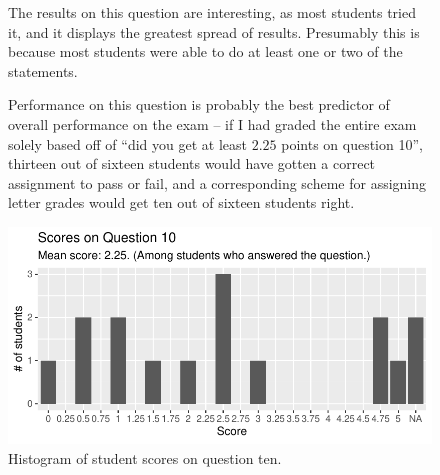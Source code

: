 \documentclass[nobib]{tufte-handout}
\begin{document}
\begin{figure}[p]
The results on this question are interesting, as most students tried it, and it displays the greatest spread of results. Presumably this is because most students were able to do at least one or two of the statements. 

Performance on this question is probably the best predictor of overall performance on the exam -- if I had graded the entire exam solely based off of ``did you get at least $2.25$ points on question 10'', thirteen out of sixteen students would have gotten a correct assignment to pass or fail, and a corresponding scheme for assigning letter grades would get ten out of sixteen students right.

  \centering
  \includegraphics[width = \textwidth]{Q10.pdf}
  \caption[Score histogram for Q10]{Histogram of student scores on question ten.}
  \label{fig:Q10}
\end{figure}
\end{document}
